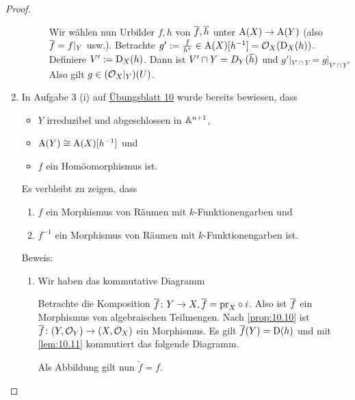 \documentclass[12pt,a4paper]{scrartcl}
\theoremstyle{cplain}
\theoremstyle{cdef}
\begin{document}
\begin{proof}
\begin{enumerate}[label=\ref{lem:10.13:\roman*}]
\begin{description}
			Wir wählen nun Urbilder $f,h$ von $\overline f, \overline h$ unter $\operatorname{A}(X)\to \operatorname{A}(Y)$ (also $\overline{f} = f|_Y$ usw.). Betrachte $g' := \frac f{h^r} \in \operatorname{A}(X)[h^{-1}] = \mathcal{O}_X(\operatorname{D}_X(h))$. Definiere $V' := \operatorname{D}_X(h)$. Dann ist $V'\cap Y = D_Y(\overline{h})$ und $g'|_{V'\cap Y} = g|_{V'\cap Y}$. Also gilt $g\in (\mathcal{O}_X|_Y)(U)$.
		\end{description}
		\item In Aufgabe 3 (i) auf \href{http://www.math.uni-bonn.de/ag/stroppel/Franzen_Algebra_1_Uebung/Blatt10a.pdf}{Übungsblatt 10} wurde bereits bewiesen, dass \begin{itemize}
			\item $Y$ irreduzibel und abgeschlossen in $\mathbb A^{n+1}$,
			\item $\operatorname{A}(Y)\cong \operatorname{A}(X)[h^{-1}]$ und
			\item $f$ ein Homöomorphismus ist. 
		\end{itemize}
		Es verbleibt zu zeigen, dass \begin{enumerate}
			\item $f$ ein Morphismus von Räumen mit $k$-Funktionengarben und \label{lem:10.13:ii:a}
			\item $f^{-1}$ ein Morphismus von Räumen mit $k$-Funktionengarben ist. \label{lem:10.13:ii:b}
		\end{enumerate}
		Beweis:
		\begin{enumerate}[label=\ref{lem:10.13:ii:\alph*}]
			\item Wir haben das kommutative Diagramm
				\begin{center}
				\end{center}
				Betrachte die Komposition $\overline{f}\colon Y \to X, \overline{f} =  {\operatorname{pr}}_X\circ i$. Also ist $\overline{f}$ ein Morphismus von algebraischen Teilmengen. Nach \cref{prop:10.10} ist $\overline{f}\colon (Y,\mathcal{O}_Y)\to (X,\mathcal{O}_X)$ ein Morphismus. Es gilt $\overline{f}(Y) = \operatorname{D}(h)$ und mit \cref{lem:10.11} kommutiert das folgende Diagramm.
				\begin{center}
				\end{center}
				Als Abbildung gilt nun $\tilde f = f$.
				

\end{enumerate}
\end{enumerate}
\end{proof}
\end{document}
